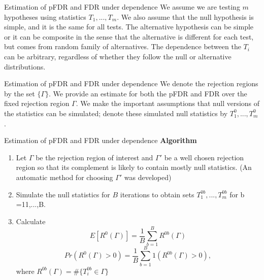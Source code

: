 \documentclass{beamer}
\begin{document}
\begin{frame}[t]{Estimation of pFDR and FDR under dependence}\vspace{10pt}
We assume we are testing $m$ hypotheses using statistics $T_1,...,T_m$. We also assume that the null hypothesis is simple, and it is the same for all tests. The alternative hypothesis can be simple or it can be composite in the sense that the alternative is different for each test, but comes from random family of alternatives. The dependence between the $T_i$ can be arbitrary, regardless of whether they follow the null or alternative distributions.

\end{frame}



\begin{frame}[t]{Estimation of pFDR and FDR under dependence}\vspace{10pt}
We denote the rejection regions by the set $\{\Gamma\}$. We provide an estimate for both the pFDR and FDR over the fixed rejection region $\Gamma$. We make the important assumptions that null versions of the statistics can be simulated; denote these simulated null statistics by $T^0_1,...,T^0_m$.

\end{frame}


\begin{frame}[t]{Estimation of pFDR and FDR under dependence}\vspace{10pt}
\textbf{Algorithm}
\begin{enumerate}
	\item Let $\Gamma$ be the rejection region of interest and $\Gamma'$ be a well chosen rejection region so that its complement is likely to contain mostly null statistics. (An automatic method for choosing $\Gamma'$ was developed)
	\item Simulate the null statistics for $B$ iterations to obtain sets $T^{0b}_1,...,T^{0b}_m$ for b =11,...,B.
	\item Calculate 
	$$ E[R^0(\Gamma)] = \frac{1}{B} \sum_{b=1}^{B}R^{0b}(\Gamma) $$
	$$ Pr(R^0(\Gamma)>0) = \frac{1}{B} \sum_{b=1}^{B}1(R^{0b}(\Gamma) >0),$$
	where $R^{0b}(\Gamma) = \#\{T^{0b}_i \in \Gamma\}$
	
	
\end{enumerate}

\end{frame}
\end{document}
